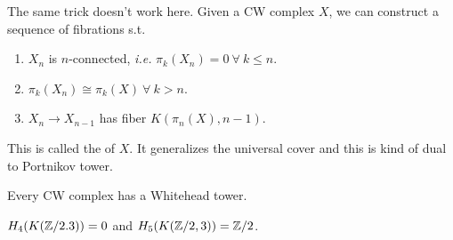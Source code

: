 \documentclass[12pt,class=article,crop=false]{standalone}
\begin{document}
The same trick doesn't work here. Given a CW complex $ X$, we can construct a sequence of fibrations  s.t.\ 
\begin{enumerate}[label=(\arabic*)]
	\item $ X_n$ is $ n$-connected,  \emph{i.e.} $ \pi_k(X_n) =0 \ \forall \ k \leq n$.
	\item $ \pi_k(X_n) \cong \pi_k(X) \ \forall \ k > n$.
	\item $ X_n \to X_{n-1}$ has fiber $ K(\pi_n(X),n-1)$. 
\end{enumerate}
This is called the  of $ X$. It generalizes the universal cover and this is kind of dual to Portnikov tower. 

\begin{lem}
Every CW complex has a Whitehead tower.
\end{lem}
\begin{lem}
$ H_4 (K(\mathbb{Z} /2. 3)) =0$ and $ H_5(K(\mathbb{Z} /2,3)) = \mathbb{Z} /2$.
\end{lem}
\end{document}
